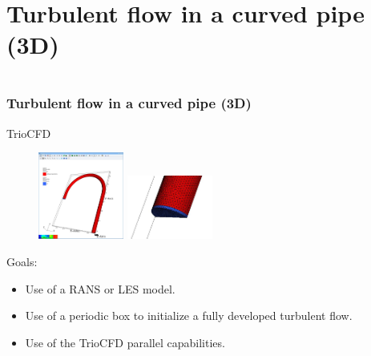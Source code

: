 \documentclass[10pt, hyperref={unicode=true,pdfusetitle, bookmarks=true,bookmarksnumbered=false,bookmarksopen=false, breaklinks=false,pdfborder={0 0 1},backref=true,colorlinks=true,linkcolor=darkblue,pageanchor}]{beamer}
\begin{document}
\section{{\bf{Turbulent flow in a curved pipe (3D)}}} \label{prm_para}
\begin{frame}
\begin{columns}[c] 
\tableofcontents[sections={1-9},currentsection, currentsubsection]
\tableofcontents[sections={10-16},currentsection, currentsubsection]
\end{columns}
\end{frame}
\begin{frame}
\frametitle{Turbulent flow in a curved pipe (3D)}
\begin{block}{TrioCFD}

\begin{figure}
\includegraphics[width=0.25\textwidth]{PICTURES/pipe2.jpg}
\includegraphics[width=0.25\textwidth]{PICTURES/pipe1.jpg}
\end{figure}

Goals:
\begin{itemize}
\item Use of a RANS or LES model.
\item Use of a periodic box to initialize a fully developed turbulent flow.
\item Use of the TrioCFD parallel capabilities.
\end{itemize}

\end{block}
\end{frame}
\end{document}
